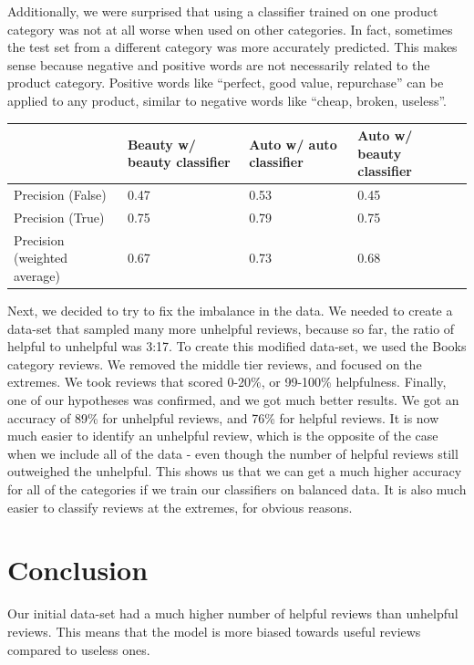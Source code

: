 \documentclass[11pt]{article}
\begin{document}
Additionally, we were surprised that using a classifier trained on one product category was not at all worse when used on other categories. In fact, sometimes the test set from a different category was more accurately predicted. This makes sense because negative and positive words are not necessarily related to the product category. Positive words like “perfect, good value, repurchase”  can be applied to any product, similar to negative words like “cheap, broken, useless”.

\vspace*{10px}
\begin{center}
\begin{tabular}{|p{1.4cm}|L{1.5cm}|L{1.5cm}|L{1.5cm}| } 
\hline
& Beauty w/ beauty classifier & Auto w/ auto classifier & Auto w/ beauty classifier \\
\hline
Precision (False) & 0.47 & 0.53 & 0.45 \\
\hline
Precision (True) & 0.75 & 0.79 & 0.75 \\
\hline
Precision (weighted average) & 0.67 & 0.73 & 0.68 \\ 
\hline
\end{tabular}
\end{center}
\vspace*{10px}

Next, we decided to try to fix the imbalance in the data. We needed to create a data-set that sampled many more unhelpful reviews, because so far, the ratio of helpful to unhelpful was 3:17. To create this modified data-set, we used the Books category reviews. We removed the middle tier reviews, and focused on the extremes. We took reviews that scored 0-20\%, or 99-100\% helpfulness. Finally, one of our hypotheses was confirmed, and we got much better results. We got an accuracy of 89\% for unhelpful reviews, and 76\% for helpful reviews. It is now much easier to identify an unhelpful review, which is the opposite of the case when we include all of the data - even though the number of helpful reviews still outweighed the unhelpful. This shows us that we can get a much higher accuracy for all of the categories if we train our classifiers on balanced data. It is also much easier to classify reviews at the extremes, for obvious reasons. 

\section{Conclusion}

Our initial data-set had a much higher number of helpful reviews than unhelpful reviews. This means that the model is more biased towards useful reviews compared to useless ones.
\end{document}
